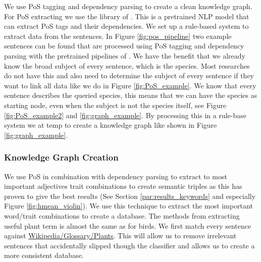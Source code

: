\documentclass[a4paper, 12pt, oneside]{book} %
\begin{document}
We use PoS tagging and dependency parsing to create a clean knowledge graph.
For PoS extracting we use the library of \textcite{honnibal_spacy_2020}.
This is a pretrained NLP model that can extract PoS tags and their dependencies.
We set up a rule-based system to extract data from the sentences.
In Figure \ref{fig:pos_pipeline} two example sentences can be found that are processed using PoS tagging and dependency parsing with the pretrained pipelines of \textcite{honnibal_spacy_2020}.
We have the benefit that we already know the broad subject of every sentence, which is the species.
Most researches do not have this and also need to determine the subject of every sentence if they want to link all data \autocite{hutchison_knowledge_2013} like we do in Figure \ref{fig:PoS_example}.
We know that every sentence describes the queried species, this means that we can have the species as starting node, even when the subject is not the species itself, see Figure \ref{fig:PoS_example2} and \ref{fig:graph_example}.
By processing this in a rule-base system we at temp to create a knowledge graph like shown in Figure \ref{fig:graph_example}.



\subsubsection{Knowledge Graph Creation}
We use PoS in combination with dependency parsing to extract to most important adjectives trait combinations to create semantic triples as this has proven to give the best results (See Section \ref{par:results_keywords} and especially Figure \ref{fig:hmean_violin}).
We use this technique to extract the most important word/trait combinations to create a database.
The methods from extracting useful plant term is almost the same as for birds.
We first match every sentence against \href{https://en.wikipedia.org/wiki/Glossary_of_plant_morphology}{Wikipedia/Glossary/Plants}.
This will allow us to remove irrelevant sentences that accidentally slipped though the classifier and allows us to create a more consistent database.
\end{document}
